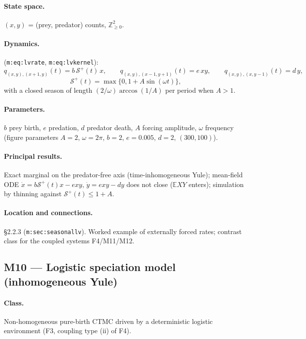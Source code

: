 \documentclass[11pt,a4paper]{article}
\newcommand{\EX}{\mathbb{E}}
\begin{document}
\paragraph{State space.} $(x,y)$ = (prey, predator) counts,
$\mathbb Z_{\ge0}^2$.

\paragraph{Dynamics.} (\texttt{m:eq:lvrate}, \texttt{m:eq:lvkernel}):
\[
q_{(x,y),(x+1,y)}(t)=b\,\mathcal S^+(t)\,x,\qquad
q_{(x,y),(x-1,y+1)}(t)=e\,xy,\qquad
q_{(x,y),(x,y-1)}(t)=d\,y,
\]
\[
\mathcal S^+(t)=\max\{0,1+A\sin(\omega t)\},
\]
with a closed season of length $(2/\omega)\arccos(1/A)$ per period when
$A>1$.

\paragraph{Parameters.} $b$ prey birth, $e$ predation, $d$ predator death,
$A$ forcing amplitude, $\omega$ frequency (figure parameters
$A=2$, $\omega=2\pi$, $b=2$, $e=0.005$, $d=2$, $(300,100)$).

\paragraph{Principal results.} Exact marginal on the predator-free axis
(time-inhomogeneous Yule); mean-field ODE $\dot x=b\mathcal S^+(t)x-exy$,
$\dot y=exy-dy$ does not close ($\EX{XY}$ enters); simulation by thinning
against $\mathcal S^+(t)\le1+A$.

\paragraph{Location and connections.} \S2.2.3 (\texttt{m:sec:seasonallv}).
Worked example of externally forced rates; contrast class for the coupled
systems F4/M11/M12.

\subsection{M10 --- Logistic speciation model (inhomogeneous Yule)}
\label{sec:M10}

\paragraph{Class.} Non-homogeneous pure-birth CTMC driven by a
deterministic logistic environment (F3, coupling type (ii) of F4).
\end{document}
